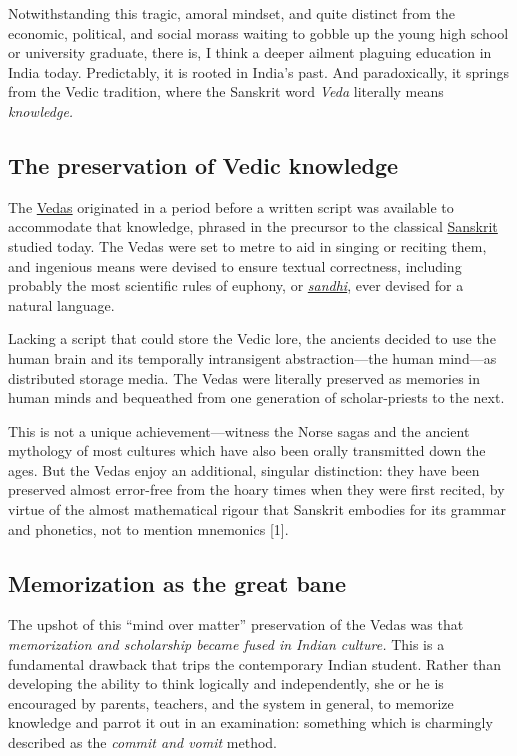 \documentclass[
  11pt,
  british,
  a4paper,
]{article}
\begin{document}
Notwithstanding this tragic, amoral mindset, and quite distinct from the
economic, political, and social morass waiting to gobble up the young
high school or university graduate, there is, I think a deeper ailment
plaguing education in India today. Predictably, it is rooted in India's
past. And paradoxically, it springs from the Vedic tradition, where the
Sanskrit word \emph{Veda} literally means \emph{knowledge.}

\hypertarget{the-preservation-of-vedic-knowledge}{%
\subsection{The preservation of Vedic
knowledge}\label{the-preservation-of-vedic-knowledge}}

The \href{http://en.wikipedia.org/wiki/Vedas}{Vedas} originated in a
period before a written script was available to accommodate that
knowledge, phrased in the precursor to the classical
\href{http://en.wikipedia.org/wiki/Sanskrit}{Sanskrit} studied today.
The Vedas were set to metre to aid in singing or reciting them, and
ingenious means were devised to ensure textual correctness, including
probably the most scientific rules of euphony, or
\href{https://en.wikipedia.org/wiki/Sandhi}{\emph{sandhi}}, ever devised
for a natural language.

Lacking a script that could store the Vedic lore, the ancients decided
to use the human brain and its temporally intransigent abstraction---the
human mind---as distributed storage media. The Vedas were literally
preserved as memories in human minds and bequeathed from one generation
of scholar-priests to the next.

This is not a unique achievement---witness the Norse sagas and the
ancient mythology of most cultures which have also been orally
transmitted down the ages. But the Vedas enjoy an additional, singular
distinction: they have been preserved almost error-free from the hoary
times when they were first recited, by virtue of the almost mathematical
rigour that Sanskrit embodies for its grammar and phonetics, not to
mention mnemonics {[}1{]}.

\hypertarget{memorization-as-the-great-bane}{%
\subsection{Memorization as the great
bane}\label{memorization-as-the-great-bane}}

The upshot of this ``mind over matter'' preservation of the Vedas was
that \emph{memorization and scholarship became fused in Indian culture.}
This is a fundamental drawback that trips the contemporary Indian
student. Rather than developing the ability to think logically and
independently, she or he is encouraged by parents, teachers, and the
system in general, to memorize knowledge and parrot it out in an
examination: something which is charmingly described as the \emph{commit
and vomit} method.
\end{document}
